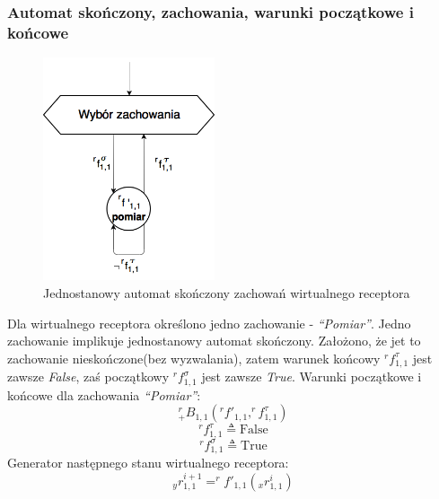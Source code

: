 \documentclass{article}
\begin{document}

\subsubsection{Automat skończony, zachowania, warunki początkowe i końcowe}
\begin{figure}[H]
	\centering
	\includegraphics[width=0.45\textwidth]{WR_automat.png}
	\caption{Jednostanowy automat skończony zachowań wirtualnego receptora}
	\label{fig::WR_automat}
\end{figure}

Dla wirtualnego receptora okre\'slono jedno zachowanie - \textit{``Pomiar''}. Jedno zachowanie implikuje jednostanowy automat skończony. Założono, że jet to zachowanie nieskończone(bez wyzwalania), zatem warunek końcowy $^rf^\tau_{1,1}$ jest zawsze \textit{False}, za\'s początkowy  $^rf^\sigma_{1,1}$ jest zawsze \textit{True}.
\newline
Warunki początkowe i końcowe dla zachowania \textit{``Pomiar''}:
\[^r_+B_{1,1}( ^{r}f'_{1,1}, ^rf^\tau_{1,1} )\]
\[^rf^\tau_{1,1} \triangleq \mbox{False}\]
\[^rf^\sigma_{1,1} \triangleq \mbox{True}\]
Generator następnego stanu wirtualnego receptora:
\[ _yr^{i+1}_{1,1} = ^{r}f'_{1,1}(_xr^i_{1,1})\]

\end{document}
